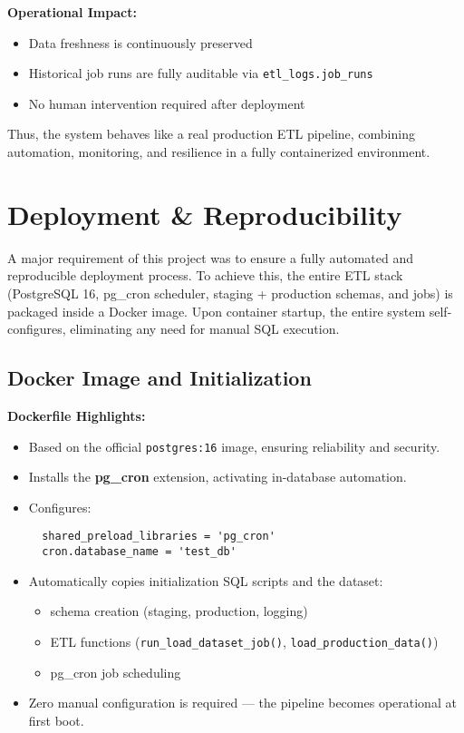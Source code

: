 \documentclass[11pt]{article}
\begin{document}
\textbf{Operational Impact:}
\begin{itemize}
\item Data freshness is continuously preserved
\item Historical job runs are fully auditable via \texttt{etl\_logs.job\_runs}
\item No human intervention required after deployment
\end{itemize}

Thus, the system behaves like a real production ETL pipeline, combining automation, monitoring, and resilience in a fully containerized environment.

\section{Deployment \& Reproducibility}

A major requirement of this project was to ensure a fully automated and reproducible deployment process. To achieve this, the entire ETL stack (PostgreSQL 16, pg\_cron scheduler, staging + production schemas, and jobs) is packaged inside a Docker image. Upon container startup, the entire system self-configures, eliminating any need for manual SQL execution.

\subsection*{Docker Image and Initialization}

\textbf{Dockerfile Highlights:}
\begin{itemize}[leftmargin=1.4em]
  \item Based on the official \texttt{postgres:16} image, ensuring reliability and security.
  \item Installs the \textbf{pg\_cron} extension, activating in-database automation.
  \item Configures:
  \begin{verbatim}
  shared_preload_libraries = 'pg_cron'
  cron.database_name = 'test_db'
  \end{verbatim}
  \item Automatically copies initialization SQL scripts and the dataset:
        \begin{itemize}
        \item schema creation (staging, production, logging)
        \item ETL functions (\texttt{run\_load\_dataset\_job()}, \texttt{load\_production\_data()})
        \item pg\_cron job scheduling
        \end{itemize}
  \item Zero manual configuration is required — the pipeline becomes operational at first boot.
\end{itemize}
\end{document}
